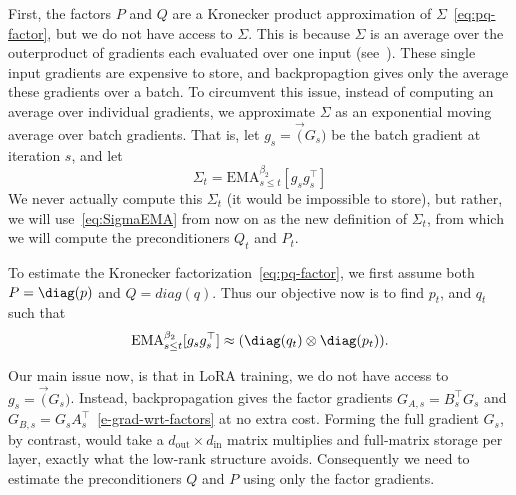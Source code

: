 First, the factors $P$ and $Q$ are a Kronecker product approximation of $\Sigma$~\eqref{eq:pq-factor}, but we do not have access to $\Sigma$. This is because $\Sigma$ is an average over the outerproduct of gradients each evaluated over one input (see~). These single input gradients are expensive to store, and backpropagtion gives only the average these gradients over a batch. To circumvent this issue, instead of computing an average over individual gradients, we approximate $\Sigma$ as an exponential moving average over  batch gradients. That is, let $g_s = \vec(G_s)$ be the batch gradient at iteration $s$, and let
\begin{equation} \label{eq:SigmaEMA}
    \Sigma_t = \mathrm{EMA}_{s\leq t}^{\beta_2}[ g_s g_s^\top ]
\end{equation}
We never actually compute this $\Sigma_t$ (it would be impossible to store), but rather, we will use~\eqref{eq:SigmaEMA} from now on as the new definition of $\Sigma_t$, from which we will compute the preconditioners $Q_t$ and $P_t.$


To estimate the Kronecker factorization~\eqref{eq:pq-factor}, we first assume both $P = \diag(p)$ and $Q=diag(q)$.  Thus our objective now is to find $p_t$, and $q_t$  such that
  \begin{equation}\label{e-diag-kron-second-mom-model}
    \mathrm{EMA}_{s\leq t}^{\beta_2}[g_sg_s^\top]\approx (\diag(q_t) \otimes \diag(p_t)).
  \end{equation}

Our main issue now, is that in LoRA training, we do not have access to $g_s = \vec(G_s)$. Instead, backpropagation gives the factor gradients $G_{A,s}=B_s^\top G_s$
and $G_{B,s}=G_sA_s^\top$~\eqref{e-grad-wrt-factors} at no extra cost. Forming
the full gradient $G_s$, by contrast, would take a $d_{\mathrm{out}}\times
d_{\mathrm{in}}$ matrix multiplies and full-matrix storage per layer, exactly what
the low-rank structure avoids. Consequently we need to estimate the preconditioners $Q$ and $P$ using only the factor gradients.



